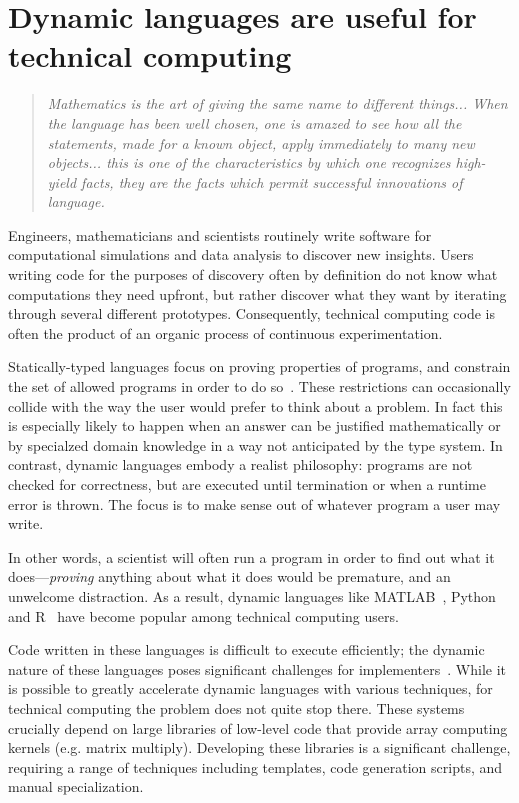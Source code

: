 \documentclass[pldi]{sigplanconf-pldi15}
\begin{document}

\section{Dynamic languages are useful for technical computing}

\begin{quote}
	\textit{Mathematics is the art of giving the same name to different
	things... When the language has been well chosen, one is amazed to see
	how all the statements, made for a known object, apply immediately
	to many new objects... this is one of the characteristics by which one
	recognizes high-yield facts, they are the facts which permit successful
	innovations of language.} \cite{Poincare1908}
\end{quote}

Engineers, mathematicians and scientists routinely write software for
computational simulations and data analysis to discover new insights.
Users writing code for the purposes of discovery often by definition do not
know what computations they need upfront, but rather discover what they want by
iterating through several different prototypes. Consequently, technical
computing code is often the product of an organic process of continuous
experimentation.

Statically-typed languages focus on proving properties of programs, and constrain
the set of allowed programs in order to do so~\cite{Pierce2002}.
These restrictions can occasionally collide with the way the user would
prefer to think about a problem. In fact this is especially likely to happen
when an answer can be justified mathematically or by specialzed domain
knowledge in a way not anticipated by the type system.
In contrast,
dynamic languages embody a realist philosophy: programs are not checked for
correctness, but are executed until termination or when a runtime error is
thrown. The focus is to make sense out of whatever program a user may write.

In other words, a scientist will often run a program in order to find out what
it does---\emph{proving} anything about what it does would be premature, and an
unwelcome distraction. As a result, dynamic languages like
MATLAB~\cite{matlab}, Python~\cite{pythonlib,pythonref} and R~\cite{rlang} have
become popular among technical computing users.

Code written in these languages is difficult to execute efficiently;
the dynamic nature of these languages poses significant challenges for
implementers~\cite{Joisha2001,Joisha2006,Seljebotn2009}. While it is possible
to greatly accelerate dynamic languages with various techniques, for
technical computing the problem does not quite stop there. These systems
crucially depend on large libraries of low-level code that provide array
computing kernels (e.g. matrix multiply). Developing these libraries is a
significant challenge, requiring a range of techniques including templates,
code generation scripts, and manual specialization.
\end{document}
